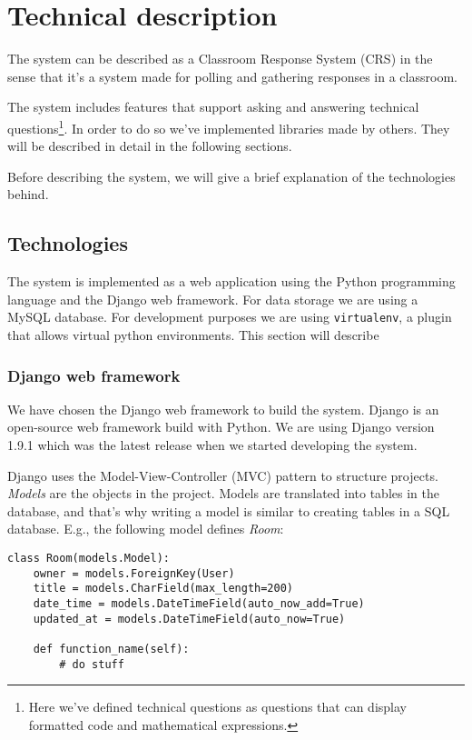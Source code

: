 \section{Technical description}
The system can be described as a Classroom Response System (CRS) in the sense that it's a system made for polling and gathering responses in a classroom.

The system includes features that support asking and answering technical questions\footnote{Here we've defined technical questions as questions that can display formatted code and mathematical expressions.}. In order to do so we've implemented libraries made by others. They will be described in detail in the following sections.

Before describing the system, we will give a brief explanation of the technologies behind.

\subsection{Technologies}

The system is implemented as a web application using the Python programming language and the Django web framework. For data storage we are using a MySQL database.
For development purposes we are using \texttt{virtualenv}, a plugin that allows virtual python environments. This section will describe 

\subsubsection{Django web framework}
We have chosen the Django web framework to build the system. Django is an open-source web framework build with Python. We are using Django version 1.9.1 which was the latest release when we started developing the system.

Django uses the Model-View-Controller (MVC) pattern to structure projects. \emph{Models} are the objects in the project. Models are translated into tables in the database, and that's why writing a model is similar to creating tables in a SQL database. E.g., the following model defines \emph{Room}: 

\begin{lstlisting}[caption=The Room Class, label=lst:room-class]
class Room(models.Model):
    owner = models.ForeignKey(User)
    title = models.CharField(max_length=200)
    date_time = models.DateTimeField(auto_now_add=True)
    updated_at = models.DateTimeField(auto_now=True)
    
    def function_name(self):
        # do stuff
\end{lstlisting}

